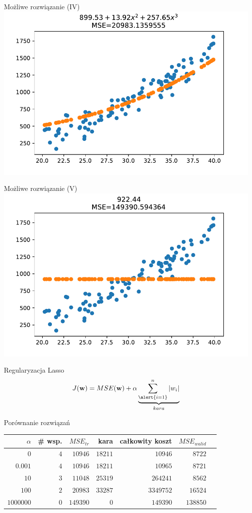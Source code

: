 \documentclass{sa}
\renewcommand{\vec}[1]{\ensuremath\mathbf{#1}}
\begin{document}
\begin{frame}{Możliwe rozwiązanie (IV)}
\includegraphics[width=\textwidth]{reg-3deg-with-noise-lasso100.pdf}
\end{frame}
\begin{frame}{Możliwe rozwiązanie (V)}
\includegraphics[width=\textwidth]{reg-3deg-with-noise-lasso1000000.pdf}
\end{frame}

\begin{frame}{Regularyzacja Lasso}
\[ J(\vec{w}) = MSE(\vec{w}) + \alpha \underbrace{\sum_{\alert{i=1}}^n \left|w_i\right|}_{kara} \]
\end{frame}

\begin{frame}{Porównanie rozwiązań}
\centering
\begin{tabular}{rrrrrrr}
$\alpha$ & \# wsp. & $MSE_{tr}$  & kara  & całkowity koszt & $MSE_{walid}$ \\
\hline
$0$ & $4$ & $10946$ & $18211$ & $10946$ & $8722$\\
$0.001$ & $4$ & $10946$ & $18211$ & $10965$ & $8721$\\
$10$ & $3$ & $11048$ & $25319$ & $264241$ & $8562$\\
$100$ & $2$ & $20983$ & $33287$ & $3349752$ & $16524$\\
$1000000$ & $0$ & $149390$ & $0$ & $149390$ & $138850$\\
\end{tabular}
\end{frame}
\end{document}
